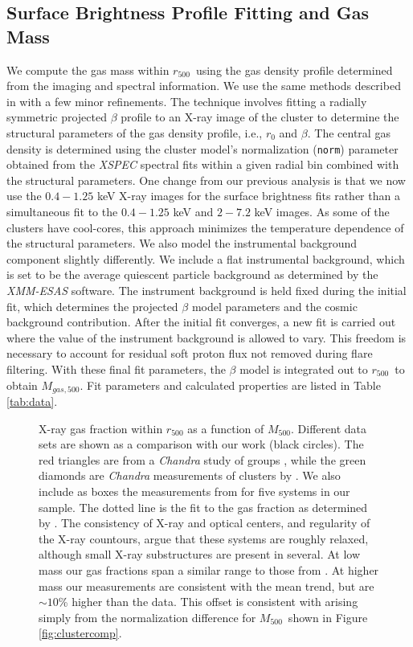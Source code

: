 \documentclass[preprint]{emulateapj}
\newcommand\rfive{$r_{500}$}
\newcommand\mfive{${M}_{500}$}
\begin{document}
\subsection{Surface Brightness Profile Fitting and Gas Mass}                  

We compute the gas mass within \rfive\ using the gas density profile
determined from the imaging and spectral information. We use the same
methods described in \cite{sivanandam2009} with a few minor
refinements. The technique involves fitting a radially symmetric
projected $\beta$ profile \citep{cavaliere1978} to an X-ray image of
the cluster to determine the structural parameters of the gas density
profile, i.e., $r_0$ and $\beta.$ The central gas density is determined
using the cluster model's normalization (\texttt{norm}) parameter obtained from
the \emph{XSPEC} spectral fits within a given radial bin combined with
the structural parameters. One change from our previous analysis is
that we now use the $0.4-1.25$ keV X-ray images for the surface
brightness fits rather than a simultaneous fit to the $0.4-1.25$ keV
and $2-7.2$ keV images. As some of the clusters have cool-cores, this
approach minimizes the temperature dependence of the structural parameters. We
also model the instrumental background component slightly
differently. We include a flat instrumental background, which is set
to be the average quiescent particle background as determined by the
\emph{XMM-ESAS} software. The instrument background is held fixed
during the initial fit, which determines the projected $\beta$ model
parameters and the cosmic background contribution. After the initial
fit converges, a new fit is carried out where the value of the
instrument background is allowed to vary. This freedom is necessary to
account for residual soft proton flux not removed during flare filtering. With these final fit
parameters, the $\beta$ model is integrated out to \rfive\ to obtain
$M_{gas,500}$. Fit parameters and calculated properties are listed in
Table \ref{tab:data}.

\begin{figure}
\caption{X-ray gas fraction within $r_{500}$ as a function of $M_{500}.$ Different data sets are shown as a comparison with our work (black circles). The red triangles are from a {\it Chandra} study of groups \citep{sun2009}, while the green diamonds are {\it Chandra} measurements of clusters by \citet{vikhlinin2006}. We also include as boxes the measurements from \citet{sanderson2013} for five systems in our sample.
The dotted line is the fit to the gas fraction as determined by \cite{vikhlinin2009}.  The consistency of X-ray and optical centers, and regularity of the X-ray countours, argue that these systems are roughly relaxed, although small X-ray substructures are present in several.
At low mass our gas fractions span a similar range to those from \citet{sun2009}. At higher mass our measurements are consistent with the mean trend, but are $\sim10$\% higher than the \citet{vikhlinin2006} data. This offset is consistent with arising simply from the normalization difference for \mfive\ shown in Figure \ref{fig:clustercomp}.
\label{fig:fgascomp}}
\end{figure}
\end{document}
